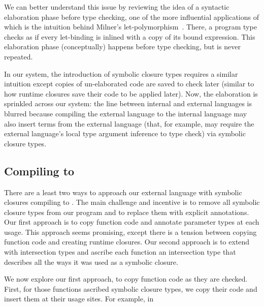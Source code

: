 We can better understand this issue by reviewing the idea of
a syntactic elaboration phase before type checking,
one of the more influential applications of which is
the intuition behind
Milner's let-polymorphism~\cite{milner1978theory}.
There, a program type checks
as if every let-binding is inlined
with a copy of its bound expression.
This elaboration phase (conceptually) happens
before type checking, but is never repeated.

In our system, the introduction of symbolic closure types requires a similar
intuition except copies of un-elaborated code
are saved
to check later
(similar to how runtime closures save their code to be applied later).
Now, the elaboration is sprinkled across our system:
the line between internal and external
languages is blurred because compiling the external language
to the internal language may also insert terms from the
external language (that, for example, may require the external language's
local type argument inference to type check)
via symbolic closure types.



\subsection{Compiling to \ltiFsub}

There are a least two ways to approach our external language
with symbolic closures compiling to \ltiFsub.
The main challenge and incentive is to remove all symbolic
closure types from our program and to replace them with
explicit annotations.
Our first approach is to copy function code and annotate
parameter types at each usage.
This approach seems promising, except there is a tension between
copying function code and creating runtime closures.
Our second approach is to extend \ltiFsub with intersection types
and ascribe each function an intersection type that 
describes all the ways it was used as a symbolic closure.

We now explore our first approach, to copy function code as they
are checked.
First, for those functions ascribed symbolic closure types, we
copy their code and insert them at their usage sites.
For example,  in 


